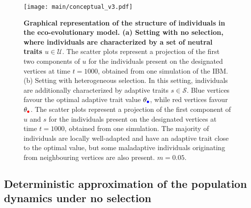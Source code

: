 \begin{figure}[ht]%
  \centering
  \texttt{[image: main/conceptual\_v3.pdf]}
  \caption{\textbf{Graphical representation of the structure of individuals in the eco-evolutionary model. (a) Setting with no selection, where individuals are characterized by a set of neutral traits $u \in \mathcal{U}$}. The scatter plots represent a projection of the first two components of $u$ for the individuals present on the designated vertices at time $t=1000$, obtained from one simulation of the IBM.\\
  (b) Setting with heterogeneous selection. In this setting, individuals are additionally characterized by adaptive traits $s \in \mathcal{S}$. Blue vertices favour the optimal adaptive trait value $\theta_{\bcirc}$, while red vertices favour $\theta_{\rcirc}$. The scatter plots represent a projection of the first component of $u$ and $s$ for the individuals present on the designated vertices at time $t = 1000$, obtained from one simulation. The majority of individuals are locally well-adapted and have an adaptive trait close to the optimal value, but some maladaptive individuals originating from neighbouring vertices are also present. $m = 0.05$.}
  \label{fig:conceptual}
\end{figure}

\subsection{Deterministic approximation of the population dynamics under no selection}\label{sec:212}

